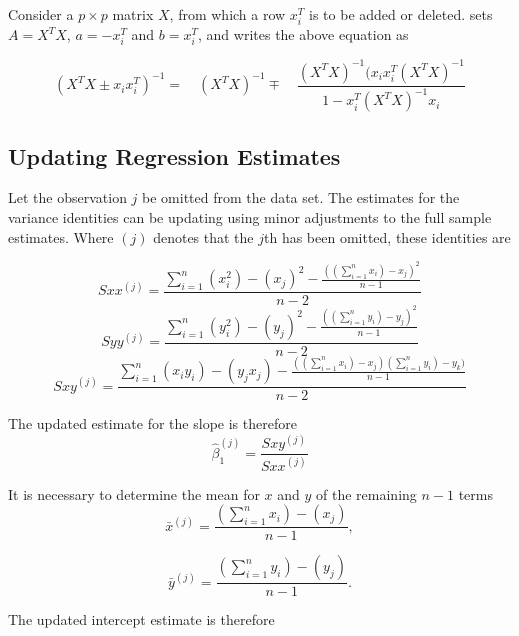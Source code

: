 \documentclass[MAIN.tex]{subfiles}
\begin{document}
Consider a $p \times p$ matrix $X$, from which a row $x_{i}^{T}$
is to be added or deleted. \citet{CookWeisberg} sets $A = X^{T}X$,
$a=-x_{i}^{T}$ and $b=x_{i}^{T}$, and writes the above equation as

\begin{equation}
(X^{T}X \pm x_{i}x_{i}^{T})^{-1} = \quad(X^{T}X )^{-1} \mp \quad
\frac{(X^{T}X)^{-1}(x_{i}x_{i}^{T}(X^{T}X)^{-1}}{1-x_{i}^{T}(X^{T}X)^{-1}x_{i}}
\end{equation}




	\subsection{Updating Regression Estimates}
	Let the observation $j$ be omitted from the data set. The estimates for the variance identities can be updating using minor adjustments to the full sample estimates. Where $(j)$ denotes that the $j$th has been omitted, these identities are
	
	\begin{equation}
	Sxx^{(j)}=\frac{\sum_{i=1}^{n}(x_{i}^{2})-(x_{j})^{2}-\frac{((\sum_{i=1}^{n}x_{i})-x_{j})^{2}}{n-1}}{n-2}
	\end{equation}
	\begin{equation}
	Syy^{(j)}=\frac{\sum_{i=1}^{n}(y_{i}^{2})-(y_{j})^{2}-\frac{((\sum_{i=1}^{n}y_{i})-y_{j})^{2}}{n-1}}{n-2}
	\end{equation}
	\begin{equation}
	Sxy^{(j)}=\frac{\sum_{i=1}^{n}(x_{i}y_{i})-(y_{j}x_{j})-\frac{((\sum_{i=1}^{n}x_{i})-x_{j})(\sum_{i=1}^{n}y_{i})-y_{k})}{n-1}}{n-2}
	\end{equation}
	
	The updated estimate for the slope is therefore
	\begin{equation}
	\hat{\beta}_{1}^{(j)}=\frac{Sxy^{(j)}}{Sxx^{(j)}}
	\end{equation}
	
	It is necessary to determine the mean for $x$ and $y$ of the remaining $n-1$ terms
	\begin{equation}
	\bar{x}^{(j)}=\frac{(\sum_{i=1}^{n}x_{i})-(x_{j})}{n-1},
	\end{equation}
	
	\begin{equation}
	\bar{y}^{(j)}=\frac{(\sum_{i=1}^{n}y_{i})-(y_{j})}{n-1}.
	\end{equation}
	
	The updated intercept estimate is therefore
	
\end{document}
